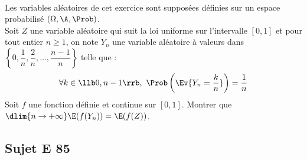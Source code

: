 \documentclass[11pt]{article}
\begin{document}

\begin{exerciceSP}~\\
Les variables aléatoires de cet exercice sont supposées définies sur un 
espace probabilisé $(\Omega,\A,\Prob)$.\\
Soit $Z$ une variable aléatoire qui suit la loi uniforme sur 
l'intervalle $[0,1]$ et pour tout entier $n\geq 1$, on note $Y_n$ une 
variable aléatoire à valeurs dans 
$\left\{0,\dfrac{1}{n},\dfrac{2}{n},\hdots, \dfrac{n-1}{n}\right\}$ 
telle que : 
\[
  \forall k\in\llb 0,n-1\rrb, \ 
  \Prob\left(\Ev{Y_n=\dfrac{k}{n}}\right)=\dfrac{1}{n}
\]
Soit $f$ une fonction définie et continue sur $[0,1]$. Montrer que 
$\dlim{n\to+\infty} \E(f(Y_n))=\E(f(Z))$.
\end{exerciceSP}




\subsection*{Sujet E 85}

\end{document}
